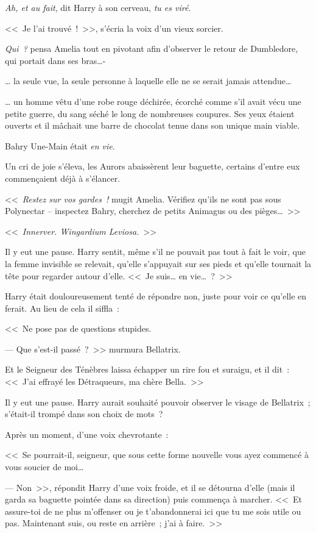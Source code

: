 \emph{Ah, et au fait}, dit Harry à son cerveau, \emph{tu es viré}.

\later

<<~Je l'ai trouvé~!~>>, s'écria la voix d'un vieux sorcier.

\emph{Qui~?} pensa Amelia tout en pivotant afin d'observer le retour de Dumbledore, qui portait dans ses bras…-

… la seule vue, la seule personne à laquelle elle ne se serait jamais attendue…

… un homme vêtu d'une robe rouge déchirée, écorché comme s'il avait vécu une petite guerre, du sang séché le long de nombreuses coupures. Ses yeux étaient ouverts et il mâchait une barre de chocolat tenue dans son unique main viable.

Bahry Une-Main était \emph{en vie}.

Un cri de joie s'éleva, les Aurors abaissèrent leur baguette, certains d'entre eux commençaient déjà à s'élancer.

<<~\emph{Restez sur vos gardes~!} mugit Amelia. Vérifiez qu'ils ne sont pas sous Polynectar -- inspectez Bahry, cherchez de petits Animagus ou des pièges…~>>

\later

<<~\emph{Innerver. Wingardium Leviosa.}~>>

Il y eut une pause. Harry sentit, même s'il ne pouvait pas tout à fait le voir, que la femme invisible se relevait, qu'elle s'appuyait sur ses pieds et qu'elle tournait la tête pour regarder autour d'elle. <<~Je suis… en vie…~?~>>

Harry était douloureusement tenté de répondre non, juste pour voir ce qu'elle en ferait. Au lieu de cela il siffla~:

<<~Ne pose pas de questions stupides.

--- Que s'est-il passé~?~>> murmura Bellatrix.

Et le Seigneur des Ténèbres laissa échapper un rire fou et suraigu, et il dit~: <<~J'ai effrayé les Détraqueurs, ma chère Bella.~>>

Il y eut une pause. Harry aurait souhaité pouvoir observer le visage de Bellatrix~; s'était-il trompé dans son choix de mots~?

Après un moment, d'une voix chevrotante~:

<<~Se pourrait-il, seigneur, que sous cette forme nouvelle vous ayez commencé à vous soucier de moi…

--- Non~>>, répondit Harry d'une voix froide, et il se détourna d'elle (mais il garda sa baguette pointée dans sa direction) puis commença à marcher. <<~Et assure-toi de ne plus m'offenser ou je t'abandonnerai ici que tu me sois utile ou pas. Maintenant suis, ou reste en arrière~; j'ai à faire.~>>


